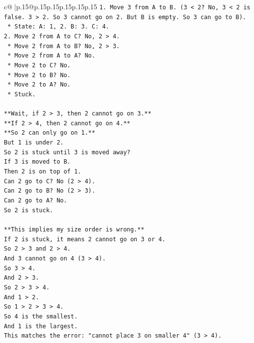 \documentclass{article}
\begin{document}
{\begin{supertabular}{c@{$\;$}|p{.15\linewidth}@{}p{.15\linewidth}p{.15\linewidth}p{.15\linewidth}p{.15\linewidth}p{.15\linewidth}}
{{{\texttt{1.  Move 3 from A to B. (3 < 2? No, 3 < 2 is false. 3 > 2. So 3 cannot go on 2. But B is empty. So 3 can go to B).} \\
\texttt{    *   State: A: 1, 2. B: 3. C: 4.} \\
\texttt{2.  Move 2 from A to C? No, 2 > 4.} \\
\texttt{    *   Move 2 from A to B? No, 2 > 3.} \\
\texttt{    *   Move 2 from A to A? No.} \\
\texttt{    *   Move 2 to C? No.} \\
\texttt{    *   Move 2 to B? No.} \\
\texttt{    *   Move 2 to A? No.} \\
\texttt{    *   Stuck.} \\
\\ 
\texttt{**Wait, if 2 > 3, then 2 cannot go on 3.**} \\
\texttt{**If 2 > 4, then 2 cannot go on 4.**} \\
\texttt{**So 2 can only go on 1.**} \\
\texttt{But 1 is under 2.} \\
\texttt{So 2 is stuck until 3 is moved away?} \\
\texttt{If 3 is moved to B.} \\
\texttt{Then 2 is on top of 1.} \\
\texttt{Can 2 go to C? No (2 > 4).} \\
\texttt{Can 2 go to B? No (2 > 3).} \\
\texttt{Can 2 go to A? No.} \\
\texttt{So 2 is stuck.} \\
\\ 
\texttt{**This implies my size order is wrong.**} \\
\texttt{If 2 is stuck, it means 2 cannot go on 3 or 4.} \\
\texttt{So 2 > 3 and 2 > 4.} \\
\texttt{And 3 cannot go on 4 (3 > 4).} \\
\texttt{So 3 > 4.} \\
\texttt{And 2 > 3.} \\
\texttt{So 2 > 3 > 4.} \\
\texttt{And 1 > 2.} \\
\texttt{So 1 > 2 > 3 > 4.} \\
\texttt{So 4 is the smallest.} \\
\texttt{And 1 is the largest.} \\
\texttt{This matches the error: "cannot place 3 on smaller 4" (3 > 4).} \\
}}}
\end{supertabular}}
\end{document}
